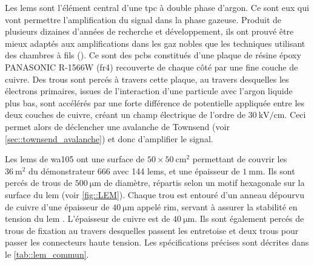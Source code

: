             Les \glspl{lem} sont l'élément central d'une \gls{tpc} à double phase d'argon. Ce sont eux qui vont permettre l'amplification du signal dans la phase gazeuse. Produit de plusieurs dizaines d'années de recherche et développement, ils ont prouvé être mieux adaptés aux amplifications dans les gaz nobles que les techniques utilisant des chambres à fils (\cite{Buzulutskov2000,Breskin2008}). Ce sont des \glspl{pcb} constitués d'une plaque de résine époxy PANASONIC R-1566W (\gls{fr4}) recouverte de chaque côté par une fine couche de cuivre. Des trous sont percés à travers cette plaque, au travers desquelles les électrons primaires, issues de l'interaction d'une particule avec l'argon liquide plus bas, sont accélérés par une forte différence de potentielle appliquée entre les deux couches de cuivre, créant un champ électrique de l'ordre de $\SI{30}{\kilo\volt\per\centi\meter}$. Ceci permet alors de déclencher une avalanche de Townsend (voir \autoref{sec::townsend_avalanche}) et donc d'amplifier le signal.
            
            
            
            Les \glspl{lem} de \gls{wa105} ont une surface de $50\times\SI{50}{\centi\meter\squared}$ permettant de couvrir les $\SI{36}{\meter\squared}$ du démonstrateur 666 avec 144 \glspl{lem}, et une épaisseur de $\SI{1}{\milli\meter}$. Ils sont percés de  trous de $\SI{500}{\micro\meter}$ de diamètre, répartis selon un motif hexagonale sur la surface du \gls{lem} (voir \autoref{fig::LEM}). Chaque trou est entouré d'un anneau dépourvu de cuivre d'une épaisseur de $\SI{40}{\micro\meter}$ appelé rim, servant à assurer la stabilité en tension du \gls{lem} \cite{Breskin2008}. L'épaisseur de cuivre est de $\SI{40}{\micro\meter}$. Ils sont également percés de  trous de fixation au travers desquelles passent les entretoise et deux trous pour passer les connecteurs haute tension. Les spécifications précises sont décrites dans le \autoref{tab::lem_commun}.
            
